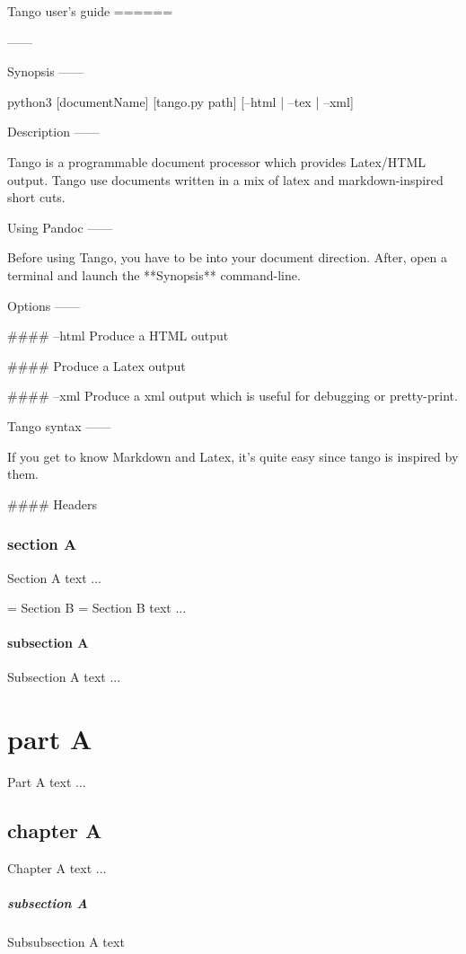 Tango user's guide
======


------


Synopsis
------

python3 [documentName] [tango.py path] [--html | --tex | --xml]


Description
------

Tango is a programmable document processor which provides Latex/HTML output.
Tango use documents written in a mix of latex and markdown-inspired short cuts.


Using Pandoc
------

Before using Tango, you have to be into your document direction.
After, open a terminal and launch the **Synopsis** command-line.

Options
------

#### --html
Produce a HTML output

####
Produce a Latex output

#### --xml
Produce a xml output which is useful for debugging or pretty-print.




Tango syntax
------

If you get to know Markdown and Latex, it's quite easy since tango is inspired by them.

#### Headers


\section{section A}
Section A text ...

= Section B =
Section B text ...

\subsection{subsection A}
Subsection A text ...

\part{part A}
Part A text ...

\chapter{chapter A}
Chapter A text ...

\subsubsection{subsection A}
Subsubsection A text

